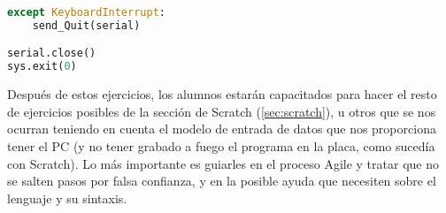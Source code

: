 \begin{description}
\begin{lstlisting}[language=python,caption={Solución de referencia del ejercicio},captionpos=b,tabsize=2,tabsize=2]
except KeyboardInterrupt:
	send_Quit(serial)

serial.close()
sys.exit(0)
\end{lstlisting}
\end{description}

Después de estos ejercicios, los alumnos estarán capacitados para hacer el resto de ejercicios posibles de la sección de Scratch (\ref{sec:scratch}), u otros que se nos ocurran teniendo en cuenta el modelo de entrada de datos que nos proporciona tener el PC (y no tener grabado a fuego el programa en la placa, como sucedía con Scratch). Lo más importante es guiarles en el proceso Agile y tratar que no se salten pasos por falsa confianza, y en la posible ayuda que necesiten sobre el lenguaje y su sintaxis. 